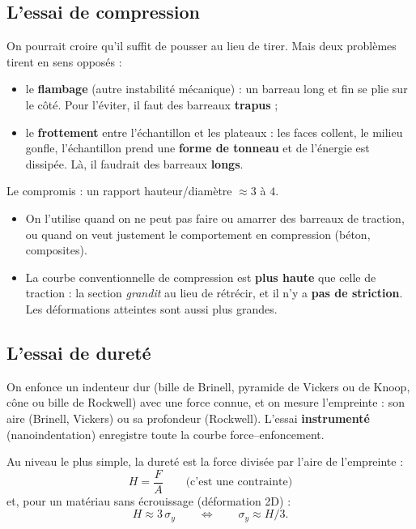 \subsection*{L'essai de compression}

On pourrait croire qu'il suffit de pousser au lieu de tirer. Mais deux problèmes tirent en
sens opposés :
\begin{itemize}
  \item le \textbf{flambage} (autre instabilité mécanique) : un barreau long et fin se plie
        sur le côté. Pour l'éviter, il faut des barreaux \textbf{trapus} ;
  \item le \textbf{frottement} entre l'échantillon et les plateaux : les faces collent, le
        milieu gonfle, l'échantillon prend une \textbf{forme de tonneau} et de l'énergie est
        dissipée. Là, il faudrait des barreaux \textbf{longs}.
\end{itemize}
Le compromis : un rapport hauteur/diamètre $\approx 3$ à $4$.


\begin{propbox}[title=Ce que donne la compression]
\begin{itemize}
  \item On l'utilise quand on ne peut pas faire ou amarrer des barreaux de traction, ou quand
        on veut justement le comportement en compression (béton, composites).
  \item La courbe conventionnelle de compression est \textbf{plus haute} que celle de
        traction : la section \emph{grandit} au lieu de rétrécir, et il n'y a \textbf{pas de
        striction}. Les déformations atteintes sont aussi plus grandes.
\end{itemize}
\end{propbox}

\subsection*{L'essai de dureté}

On enfonce un indenteur dur (bille de Brinell, pyramide de Vickers ou de Knoop, cône ou bille
de Rockwell) avec une force connue, et on mesure l'empreinte : son aire (Brinell, Vickers) ou
sa profondeur (Rockwell). L'essai \textbf{instrumenté} (nanoindentation) enregistre toute la
courbe force--enfoncement.

\begin{thmbox}[title=Dureté et limite d'élasticité]
Au niveau le plus simple, la dureté est la force divisée par l'aire de l'empreinte :
\[ H = \frac{F}{A} \qquad\text{(c'est une contrainte)} \]
et, pour un matériau sans écrouissage (déformation 2D) :
\[ H \approx 3\,\sigma_y \qquad\Longleftrightarrow\qquad \sigma_y \approx H/3 . \]
\end{thmbox}

